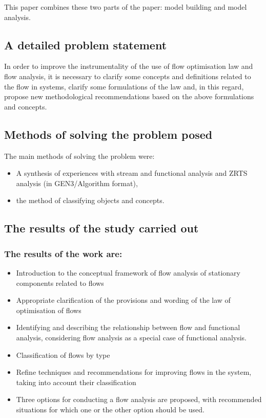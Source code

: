 \documentclass[a4paper,11pt]{article}
\begin{document}
This paper combines these two parts of the paper: model building and model
analysis.

\subsection{A detailed problem statement}

In order to improve the instrumentality of the use of flow optimisation law
and flow analysis, it is necessary to clarify some concepts and definitions
related to the flow in systems, clarify some formulations of the law and, in
this regard, propose new methodological recommendations based on the above
formulations and concepts.

\subsection{Methods of solving the problem posed}

The main methods of solving the problem were:
\begin{itemize}
\item A synthesis of experiences with stream and functional analysis and ZRTS
  analysis (in GEN3/Algorithm format),
\item the method of classifying objects and concepts.
\end{itemize}

\subsection{The results of the study carried out}

\subsubsection{The results of the work are:}
\begin{itemize}
\item Introduction to the conceptual framework of flow analysis of stationary
  components related to flows
\item Appropriate clarification of the provisions and wording of the law of
  optimisation of flows
\item Identifying and describing the relationship between flow and functional
  analysis, considering flow analysis as a special case of functional
  analysis.
\item Classification of flows by type
\item Refine techniques and recommendations for improving flows in the system,
  taking into account their classification
\item Three options for conducting a flow analysis are proposed, with
  recommended situations for which one or the other option should be used.
\end{itemize}
\end{document}
